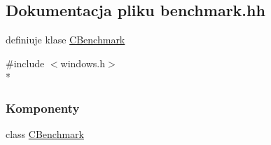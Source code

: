 \hypertarget{benchmark_8hh}{}\subsection{Dokumentacja pliku benchmark.\+hh}
\label{benchmark_8hh}


definiuje klase \hyperlink{class_c_benchmark}{C\+Benchmark}  


{\ttfamily \#include $<$windows.\+h$>$}\\*
\subsubsection*{Komponenty}
\begin{DoxyCompactItemize}
\item 
class \hyperlink{class_c_benchmark}{C\+Benchmark}
\end{DoxyCompactItemize}
